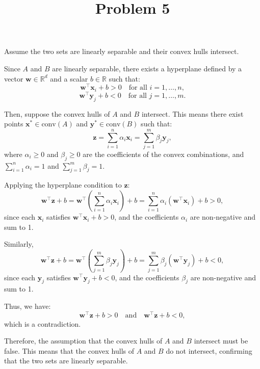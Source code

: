 \documentclass[12pt]{article}
\title{Problem 5}
\author{}
\date{}
\begin{document}
\maketitle
\thispagestyle{empty}

Assume the two sets are linearly separable and their convex hulls intersect.

Since \( A \) and \( B \) are linearly separable, there exists a hyperplane defined by a vector \( \mathbf{w} \in \mathbb{R}^d \) and a scalar \( b \in \mathbb{R} \) such that:
\[
\mathbf{w}^\top \mathbf{x}_i + b > 0 \quad \text{for all } i = 1, \dots, n,
\]
\[
\mathbf{w}^\top \mathbf{y}_j + b < 0 \quad \text{for all } j = 1, \dots, m.
\]

Then, suppose the convex hulls of \( A \) and \( B \) intersect. This means there exist points \( \mathbf{x}^* \in \text{conv}(A) \) and \( \mathbf{y}^* \in \text{conv}(B) \) such that:
\[
\mathbf{z} = \sum_{i=1}^{n} \alpha_i \mathbf{x}_i = \sum_{j=1}^{m} \beta_j \mathbf{y}_j,
\]
where \( \alpha_i \geq 0 \) and \( \beta_j \geq 0 \) are the coefficients of the convex combinations, and \( \sum_{i=1}^{n} \alpha_i = 1 \) and \( \sum_{j=1}^{m} \beta_j = 1 \).

Applying the hyperplane condition to \( \mathbf{z} \):
\[
\mathbf{w}^\top \mathbf{z} + b = \mathbf{w}^\top \left( \sum_{i=1}^{n} \alpha_i \mathbf{x}_i \right) + b = \sum_{i=1}^{n} \alpha_i (\mathbf{w}^\top \mathbf{x}_i) + b > 0,
\]
since each \( \mathbf{x}_i \) satisfies \( \mathbf{w}^\top \mathbf{x}_i + b > 0 \), and the coefficients \( \alpha_i \) are non-negative and sum to 1.

Similarly,
\[
\mathbf{w}^\top \mathbf{z} + b = \mathbf{w}^\top \left( \sum_{j=1}^{m} \beta_j \mathbf{y}_j \right) + b = \sum_{j=1}^{m} \beta_j (\mathbf{w}^\top \mathbf{y}_j) + b < 0,
\]
since each \( \mathbf{y}_j \) satisfies \( \mathbf{w}^\top \mathbf{y}_j + b < 0 \), and the coefficients \( \beta_j \) are non-negative and sum to 1.

Thus, we have:
\[
\mathbf{w}^\top \mathbf{z} + b > 0 \quad \text{and} \quad \mathbf{w}^\top \mathbf{z} + b < 0,
\]
which is a contradiction.

Therefore, the assumption that the convex hulls of \( A \) and \( B \) intersect must be false.
This means that the convex hulls of \( A \) and \( B \) do not intersect, confirming that the two sets are linearly separable.
\end{document}
